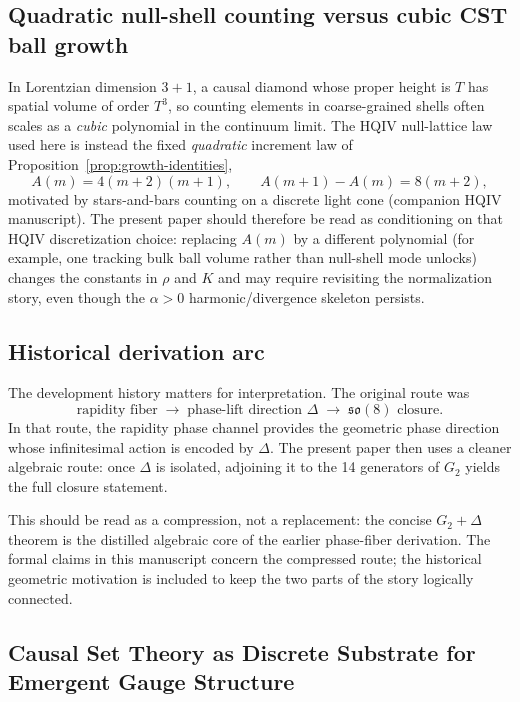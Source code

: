 \documentclass[11pt]{amsart}
\begin{document}
\subsection*{Quadratic null-shell counting versus cubic CST ball growth}

In Lorentzian dimension \(3+1\), a causal diamond whose proper height is \(T\) has spatial volume of order \(T^3\), so counting elements in coarse-grained shells often scales as a \emph{cubic} polynomial in the continuum limit. The HQIV null-lattice law used here is instead the fixed \emph{quadratic} increment law of Proposition~\ref{prop:growth-identities},
\[
A(m)=4(m+2)(m+1),\qquad A(m+1)-A(m)=8(m+2),
\]
motivated by stars-and-bars counting on a discrete light cone (companion HQIV manuscript). The present paper should therefore be read as conditioning on that HQIV discretization choice: replacing \(A(m)\) by a different polynomial (for example, one tracking bulk ball volume rather than null-shell mode unlocks) changes the constants in \(\rho\) and \(K\) and may require revisiting the normalization story, even though the \(\alpha>0\) harmonic/divergence skeleton persists.

\subsection*{Historical derivation arc}

The development history matters for interpretation. The original route was
\[
\text{rapidity fiber} \;\longrightarrow\; \text{phase-lift direction } \Delta \;\longrightarrow\; \mathfrak{so}(8)\text{ closure}.
\]
In that route, the rapidity phase channel provides the geometric phase direction whose infinitesimal action is encoded by \(\Delta\). The present paper then uses a cleaner algebraic route: once \(\Delta\) is isolated, adjoining it to the 14 generators of \(G_2\) yields the full closure statement.

This should be read as a compression, not a replacement: the concise \(G_2+\Delta\) theorem is the distilled algebraic core of the earlier phase-fiber derivation. The formal claims in this manuscript concern the compressed route; the historical geometric motivation is included to keep the two parts of the story logically connected.

\subsection*{Causal Set Theory as Discrete Substrate for Emergent Gauge Structure}
\end{document}

